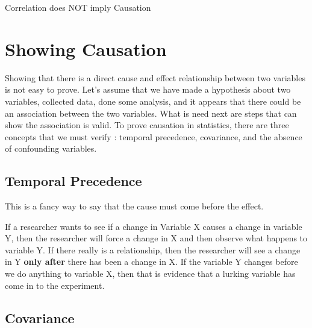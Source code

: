 \documentclass[
  letterpaper,
  DIV=11,
  numbers=noendperiod]{scrreprt}
\begin{document}
\begin{tcolorbox}[enhanced jigsaw, colback=white, colbacktitle=quarto-callout-important-color!10!white, toptitle=1mm, leftrule=.75mm, arc=.35mm, titlerule=0mm, toprule=.15mm, colframe=quarto-callout-important-color-frame, left=2mm, coltitle=black, bottomtitle=1mm, title=\textcolor{quarto-callout-important-color}{\faExclamation}\hspace{0.5em}{Important}, rightrule=.15mm, bottomrule=.15mm, breakable, opacitybacktitle=0.6, opacityback=0]

Correlation does NOT imply Causation

\end{tcolorbox}

\section*{Showing Causation}\label{showing-causation}


Showing that there is a direct cause and effect relationship between two
variables is not easy to prove. Let's assume that we have made a
hypothesis about two variables, collected data, done some analysis, and
it appears that there could be an association between the two variables.
What is need next are steps that can show the association is valid. To
prove causation in statistics, there are three concepts that we must
verify : temporal precedence, covariance, and the absence of confounding
variables.

\subsection*{Temporal Precedence}\label{temporal-precedence}

This is a fancy way to say that the cause must come before the effect.

If a researcher wants to see if a change in Variable X causes a change
in variable Y, then the researcher will force a change in X and then
observe what happens to variable Y. If there really is a relationship,
then the researcher will see a change in Y \textbf{only after} there has
been a change in X. If the variable Y changes before we do anything to
variable X, then that is evidence that a lurking variable has come in to
the experiment.

\subsection*{Covariance}\label{covariance}
\end{document}
